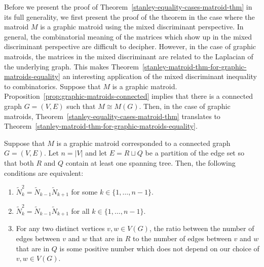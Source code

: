 \documentclass{puthesis-UG}
\begin{document}
Before we present the proof of Theorem~\ref{stanley-equality-cases-matroid-thm} in its full generality, we first present the proof of the theorem in the case where the matroid $M$ is a graphic matroid using the mixed discriminant perspective. In general, the combinatorial meaning of the matrices which show up in the mixed discriminant perspective are difficult to decipher. However, in the case of graphic matroids, the matrices in the mixed discriminant are related to the Laplacian of the underlying graph. This makes Theorem~\ref{stanley-matroid-thm-for-graphic-matroids-equality} an interesting application of the mixed discriminant inequality to combinatorics. Suppose that $M$ is a graphic matroid. Proposition~\ref{prop:graphic-matroids-connected} implies that there is a connected graph $G = (V, E)$ such that $M \cong M(G)$. Then, in the case of graphic matroids, Theorem~\ref{stanley-equality-cases-matroid-thm} translates to Theorem~\ref{stanley-matroid-thm-for-graphic-matroids-equality}. 

\begin{thm} \label{stanley-matroid-thm-for-graphic-matroids-equality}
	Suppose that $M$ is a graphic matroid corresponded to a connected graph $G = (V, E)$. Let $n = |V|$ and let $E = R \sqcup Q$ be a partition of the edge set so that both $R$ and $Q$ contain at least one spanning tree. Then, the following conditions are equivalent:
	\begin{enumerate}[label = (\alph*)]
		\item $\widetilde{N}_k^2 = \widetilde{N}_{k-1} \widetilde{N}_{k+1}$ for some $k \in \{1, \ldots, n-1\}$.

		\item $\widetilde{N}_k^2 = \widetilde{N}_{k-1} \widetilde{N}_{k+1}$ for all $k \in \{1, \ldots, n-1\}$. 

		\item For any two distinct vertices $v, w \in V(G)$, the ratio between the number of edges between $v$ and $w$ that are in $R$ to the number of edges between $v$ and $w$ that are in $Q$ is some positive number which does not depend on our choice of $v, w \in V(G)$. 
	\end{enumerate}
\end{thm}
\end{document}
